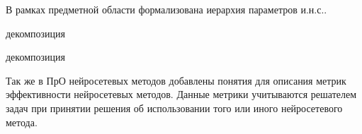 В рамках предметной области формализована иерархия параметров и.н.с..
\begin{SCn}
	\begin{scnindent}
		\begin{scneqtoset}
			\begin{scnrelfromset}{декомпозиция}
			\end{scnrelfromset}
			\begin{scnrelfromset}{декомпозиция}
			\end{scnrelfromset}
		\end{scneqtoset}
	\end{scnindent}
\end{SCn}

Так же в ПрО нейросетевых методов добавлены понятия для описания метрик эффективности нейросетевых методов. Данные метрики учитываются решателем задач при принятии решения об использовании того или иного нейросетевого метода.

